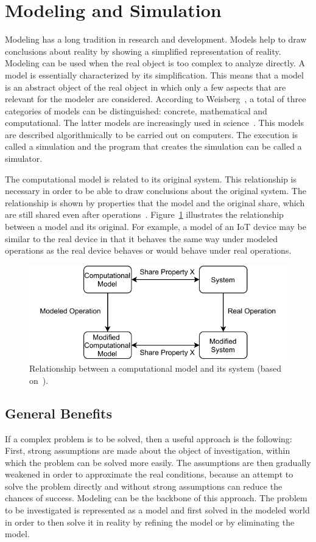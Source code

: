 \documentclass[english,version-2019-11]{uzl-thesis}
\begin{document}
\section{Modeling and Simulation}
Modeling has a long tradition in research and development.
Models help to draw conclusions about reality by showing
a simplified representation of reality. Modeling can be
used when the real object is too complex to analyze directly.
A model is essentially characterized by its simplification.
This means that a model is an abstract object of the real object
in which only a few aspects that are relevant for the modeler
are considered. According to Weisberg~\cite{Weisberg}, 
a total of three categories of models can be distinguished:
concrete, mathematical and computational. 
The latter models are increasingly used in science~\cite{Weisberg}.
This models are described algorithmically to be carried out on computers.
The execution is called a simulation and the program
that creates the simulation can be called a simulator.

The computational model is related to its original system.
This relationship is necessary in order to be able to draw
conclusions about the original system.
The relationship is shown by properties that the model
and the original share, which are 
still shared even after operations~\cite{Weisberg}.
Figure~\ref{figure_model} illustrates the relationship between a model and its original.
For example, a model of an IoT device may be similar
to the real device in that it behaves the same way
under modeled operations as the real device 
behaves or would behave under real operations.
\begin{figure}[htpb]
  \centering
  \includegraphics{figure_model.pdf}
  \caption{Relationship between a computational model and its system (based on~\cite{SpezModScript}).}
  \label{figure_model}
\end{figure}

\subsection{General Benefits}
If a complex problem is to be solved,
then a useful approach is the following:
First, strong assumptions are made about the object
of investigation, within which the problem can be
solved more easily.
The assumptions are then gradually
weakened in order to approximate the real conditions, because an attempt to solve the problem directly and without strong assumptions can reduce the chances of success.
Modeling can be the backbone of this approach.
The problem to be investigated is represented as
a model and first solved in the modeled world in order
to then solve it in reality by refining the model or by
eliminating the model.
\end{document}
